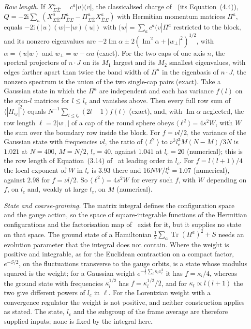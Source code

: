 \emph{Row length.} If \(X^a_{\Sigma\bar\Sigma}=c^a|u)(v|\), the classicalised charge of~\cite{FlissFrenkelHartnollSoni2025} (its Equation~(4.4)), \(Q=-2\mathrm i\sum_a(X^a_{\Sigma\bar\Sigma}\Pi^a_{\bar\Sigma\Sigma}-\Pi^a_{\Sigma\bar\Sigma}X^a_{\bar\Sigma\Sigma})\) with Hermitian momentum matrices \(\Pi^a\), equals \(-2\mathrm i(|u)(w|-|w)(u|)\) with \((w|=\sum_ac^a(v|\Pi^a\) restricted to the block, and its nonzero eigenvalues are \(-2\operatorname{Im}\alpha\pm2(\operatorname{Im}^2\alpha+|w_\perp|^2)^{1/2}\), with \(\alpha=(u|w)\) and \(w_\perp=w-\alpha u\) (exact). For the two caps of one axis \(n\), the spectral projectors of \(n\cdot J\) on its \(M_1\) largest and its \(M_2\) smallest eigenvalues, with edges farther apart than twice the band width of \(\Pi^a\) in the eigenbasis of \(n\cdot J\), the nonzero spectrum is the union of the two single-cap pairs (exact). Take a Gaussian state in which the \(\Pi^a\) are independent and each has variance \(f(l)\) on the spin-\(l\) matrices for \(l\le l_c\) and vanishes above. Then every full row sum of \(\langle|\Pi_{ij}|^2\rangle\) equals \(N^{-1}\sum_{l\le l_c}(2l+1)f(l)\) (exact), and, with \(\operatorname{Im}\alpha\) neglected, the row length \(\ell=2|w_\perp|\) of a cap of the round sphere obeys \(\langle\ell^2\rangle=4s^2W\), with \(W\) the sum over the boundary row inside the block. For \(f=\nu l/2\), the variance of the Gaussian state with frequencies \(\nu l\), the ratio of \(\langle\ell^2\rangle\) to \(\nu^3l_c^3M(N-M)/3N\) is \(1.021\) at \(N=400\), \(M=N/2\), \(l_c=40\), against \(1.041\) at \(l_c=20\) (numerical); this is the row length of Equation~(3.14) of~\cite{FlissFrenkelHartnollSoni2025} at leading order in \(l_c\). For \(f=l(l+1)/4\) the local exponent of \(W\) in \(l_c\) is \(3.93\) there and \(16NW/l_c^4=1.07\) (numerical), against \(2.98\) for \(f=\nu l/2\). So \(\langle\ell^2\rangle=4s^2W\) for every such \(f\), with \(W\) depending on \(f\), on \(l_c\) and, weakly at large \(l_c\), on \(M\) (numerical).

\emph{State and coarse-graining.} The matrix integral defines the configuration space and the gauge action, so the space of square-integrable functions of the Hermitian configurations and the factorisation map of~\cite{FlissFrenkelHartnollSoni2025} exist for it, but it supplies no state on that space. The ground state of a Hamiltonian \(\tfrac12\sum_a\operatorname{Tr}(\Pi^a)^2+S\) needs an evolution parameter that the integral does not contain. Where the weight is positive and integrable, as for the Euclidean contraction on a compact factor, \(e^{-S/2}\), on the fluctuations transverse to the gauge orbits, is a state whose modulus squared is the weight; for a Gaussian weight \(e^{-\frac12\sum_l\kappa_lx_l^2}\) it has \(f=\kappa_l/4\), whereas the ground state with frequencies \(\kappa_l^{1/2}\) has \(f=\kappa_l^{1/2}/2\), and for \(\kappa_l\propto l(l+1)\) the two give different powers of \(l_c\) in \(\ell\). For the Lorentzian weight with a convergence regulator the weight is not positive, and neither construction applies as stated. The state, \(l_c\) and the subgroup of the frame average are therefore supplied inputs; none is fixed by the integral here.


